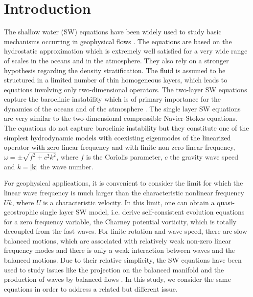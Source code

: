 \documentclass{jfm}
\newcommand{\kk}{\textbf{k}}
\begin{document}
\section{Introduction}

The shallow water (SW) equations  have been widely used to study basic
mechanisms occurring in geophysical flows \cite[see for
example][]{VallisLIVRE2006}.
%
The equations are based on the hydrostatic approximation which is
extremely well satisfied for a very wide range of scales in the oceans
and in the atmosphere.  They also rely on a stronger hypothesis
regarding the density stratification.  The fluid is assumed to be
structured in a limited number of thin homogeneous layers, which leads
to equations involving only two-dimensional operators. The two-layer
SW equations capture the baroclinic instability which is of
primary importance for the dynamics of the oceans and of the
atmosphere \cite[]{VallisLIVRE2006, Wirth2013}.
%
The single layer SW equations are very similar to
the two-dimensional compressible Navier-Stokes equations.  The
equations do not capture baroclinic instability but they constitute
one of the simplest hydrodynamic models with coexisting eigenmodes of
the linearized operator with zero linear frequency and with finite
non-zero linear frequency, $\omega = \pm\sqrt{f^2 + c^2
k^2}$, where $f$ is the Coriolis parameter, $c$ the gravity wave speed and $k
= |\kk|$ the wave number.
%

For geophysical applications, it is convenient to consider the limit
for which the linear wave frequency  is much larger than the
characteristic nonlinear frequency $ U k$, where $U$ is a
characteristic velocity.  In this limit, one can obtain a quasi-geostrophic
single layer SW model, i.e. derive self-consistent evolution
equations for a zero frequency variable, the Charney potential
vorticity, which is totally decoupled from the fast waves.
%
For finite rotation and wave speed, there are slow balanced motions,
which are associated with relatively weak non-zero linear frequency
modes and there is only a weak
interaction between waves and the balanced motions.
%
Due to their relative simplicity, the SW equations have
been used to study issues like the projection on the balanced manifold
\cite[]{Lorenz1980, MohebalhojehDritschel2000} and the production of
waves by balanced flows \cite[]{FargeSadourny1989,
LahayeZeitlin2012,Vanneste2013}.
In this study, we consider the
same equations in order to address a related but different issue.
\end{document}
